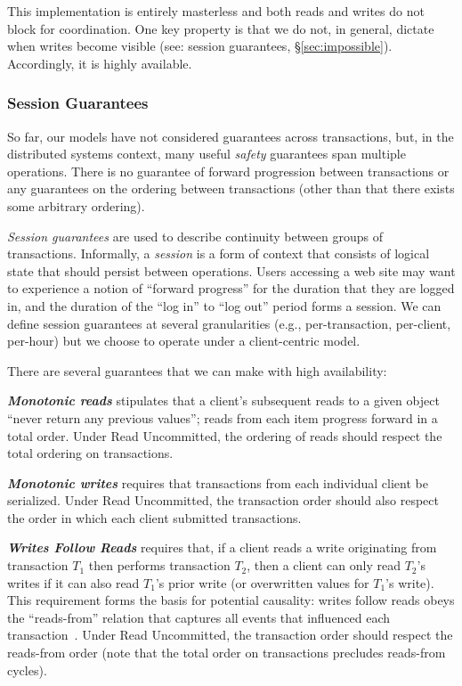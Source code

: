 This implementation is entirely masterless and both reads and writes
do not block for coordination. One key property is that we do not, in general,
dictate when writes become visible (see: session guarantees,
\S\ref{sec:impossible}). Accordingly, it is highly available.\vspace{.5em}

\subsubsection{Session Guarantees}

So far, our models have not considered guarantees across transactions,
but, in the distributed systems context, many useful \textit{safety}
guarantees span multiple operations. There is no guarantee of forward
progression between transactions or any guarantees on the ordering
between transactions (other than that there exists some arbitrary
ordering).

\textit{Session guarantees} are used to describe continuity between
groups of transactions. Informally, a \textit{session} is a form of
context that consists of logical state that should persist between
operations. Users accessing a web site may want to experience a notion
of ``forward progress'' for the duration that they are logged in, and
the duration of the ``log in'' to ``log out'' period forms a
session. We can define session guarantees at several granularities
(e.g., per-transaction, per-client, per-hour) but we choose to operate
under a client-centric model.

There are several guarantees that we can make with high availability:

\vspace{.25em}\noindent\textit{\textbf{Monotonic reads}} stipulates
that a client's subsequent reads to a given object ``never return any
previous values''; reads from each item progress forward in a total
order. Under Read Uncommitted, the ordering of reads should respect the
total ordering on transactions.

\vspace{.25em}\noindent\textit{\textbf{Monotonic writes}} requires
that transactions from each individual client be serialized. Under
Read Uncommitted, the transaction order should also respect the order
in which each client submitted transactions.

\vspace{.25em}\noindent\textit{\textbf{Writes Follow Reads}} requires
that, if a client reads a write originating from transaction $T_1$
then performs transaction $T_2$, then a client can only read $T_2$'s
writes if it can also read $T_1$'s prior write (or overwritten values
for $T_1$'s write). This requirement forms the basis for potential
causality: writes follow reads obeys the ``reads-from'' relation that
captures all events that influenced each
transaction~\cite{causalmemory}. Under Read Uncommitted, the
transaction order should respect the reads-from order (note that the
total order on transactions precludes reads-from cycles).

